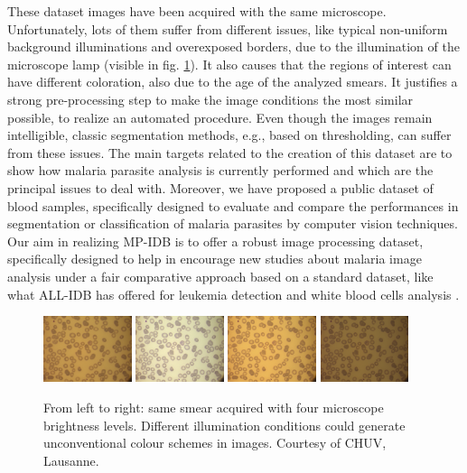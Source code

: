 {	These dataset images have been acquired with the same microscope. Unfortunately, lots of them suffer from different issues, like typical non-uniform background illuminations and overexposed borders, due to the illumination of the microscope lamp (visible in fig. \ref{f1_img_types}). It also causes that the regions of interest can have different coloration, also due to the age of the analyzed smears. It justifies a strong pre-processing step to make the image conditions the most similar possible, to realize an automated procedure. Even though the images remain intelligible, classic segmentation methods, e.g., based on thresholding, can suffer from these issues.
	The main targets related to the creation of this dataset are to show how malaria parasite analysis is currently performed and which are the principal issues to deal with. Moreover, we have proposed a public dataset of blood samples, specifically designed to evaluate and compare the performances in segmentation or classification of malaria parasites by computer vision techniques. Our aim in realizing MP-IDB is to offer a robust image processing dataset, specifically designed to help in encourage new studies about malaria image analysis under a fair comparative approach based on a standard dataset, like what ALL-IDB \cite{Donida} has offered for leukemia detection and white blood cells analysis \cite{DiRuberto2016}. 
	
	\begin{figure}[h]
		\centering
		\includegraphics[width=0.23\textwidth]{images/malaria/f1a}
		\includegraphics[width=0.23\textwidth]{images/malaria/f1b}
		\includegraphics[width=0.23\textwidth]{images/malaria/f1c}
		\includegraphics[width=0.23\textwidth]{images/malaria/f1d}
		\caption[Different illumination conditions example.]{\label{f1_img_types} From left to right: same smear acquired with four microscope brightness levels. Different illumination conditions could generate unconventional colour schemes in images. Courtesy of CHUV, Lausanne.}
	\end{figure}
	
}
